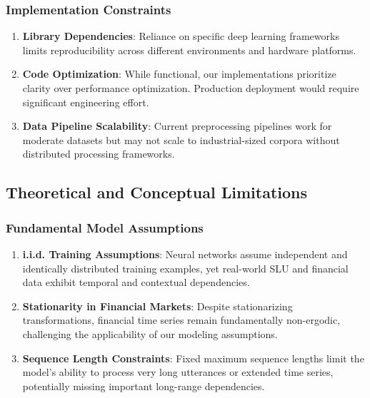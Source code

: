 \documentclass[conference]{IEEEtran}
\begin{document}
\subsubsection{Implementation Constraints}
\begin{enumerate}
  \item \textbf{Library Dependencies}: Reliance on specific deep learning frameworks limits reproducibility across different environments and hardware platforms.

  \item \textbf{Code Optimization}: While functional, our implementations prioritize clarity over performance optimization. Production deployment would require significant engineering effort.

  \item \textbf{Data Pipeline Scalability}: Current preprocessing pipelines work for moderate datasets but may not scale to industrial-sized corpora without distributed processing frameworks.
\end{enumerate}

\subsection{Theoretical and Conceptual Limitations}

\subsubsection{Fundamental Model Assumptions}
\begin{enumerate}
  \item \textbf{i.i.d. Training Assumptions}: Neural networks assume independent and identically distributed training examples, yet real-world SLU and financial data exhibit temporal and contextual dependencies.

  \item \textbf{Stationarity in Financial Markets}: Despite stationarizing transformations, financial time series remain fundamentally non-ergodic, challenging the applicability of our modeling assumptions.

  \item \textbf{Sequence Length Constraints}: Fixed maximum sequence lengths limit the model's ability to process very long utterances or extended time series, potentially missing important long-range dependencies.
\end{enumerate}
\end{document}
